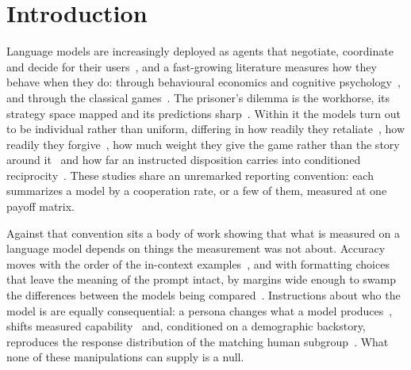 \documentclass[11pt,a4paper]{article}
\begin{document}
\section{Introduction}
\label{sec:intro}

Language models are increasingly deployed as agents that negotiate, coordinate
and decide for their users~\citep{park2023generative,dafoe2021cooperative}, and
a fast-growing literature measures how they behave when they do: through
behavioural economics and cognitive
psychology~\citep{binz2023using,horton2023large,aher2023using}, and through the
classical games~\citep{mei2024turing}. The prisoner's dilemma is the workhorse,
its strategy space mapped and its predictions
sharp~\citep{axelrod1981evolution,axelrod1984evolution,nowak1992tit,nowak1993strategy,nowak2006five,press2012iterated}.
Within it the models turn out to be individual rather than uniform, differing in
how readily they retaliate~\citep{akata2023playing}, how readily they
forgive~\citep{fontana2024nicer}, how much weight they give the game rather than
the story around it~\citep{lore2024strategic} and how far an instructed
disposition carries into conditioned
reciprocity~\citep{phelps2023investigating}. These studies share an unremarked
reporting convention: each summarizes a model by a cooperation rate, or a few of
them, measured at one payoff matrix.

Against that convention sits a body of work showing that what is measured on a
language model depends on things the measurement was not about. Accuracy moves
with the order of the in-context examples~\citep{lu2022fantastically}, and with
formatting choices that leave the meaning of the prompt intact, by margins wide
enough to swamp the differences between the models being
compared~\citep{sclar2024quantifying}. Instructions about who the model is are
equally consequential: a persona changes what a model
produces~\citep{deshpande2023toxicity}, shifts measured
capability~\citep{salewski2023context} and, conditioned on a demographic
backstory, reproduces the response distribution of the matching human
subgroup~\citep{argyle2023out}. What none of these manipulations can supply is a
null.
\end{document}
